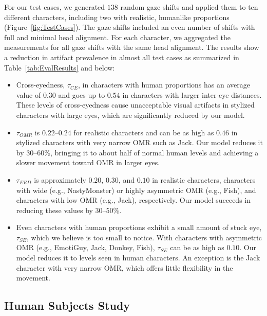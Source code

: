 For our test cases, we generated $138$ random gaze shifts and applied them to ten different characters, including two with realistic, humanlike proportions (Figure~\ref{fig:TestCases}). The gaze shifts included an even number of shifts with full and minimal head alignment. For each character, we aggregated the measurements for all gaze shifts with the same head alignment. The results show a reduction in artifact prevalence in almost all test cases as summarized in Table~\ref{tab:EvalResults} and below:

\begin{itemize}

\item Cross-eyedness, $\tau_{CE}$, in characters with human proportions has an average value of $0.30$ and goes up to $0.54$ in characters with larger inter-eye distances. These levels of cross-eyedness cause unacceptable visual artifacts in stylized characters with large eyes, which are significantly reduced by our model.

\item $\tau_{OMR}$ is $0.22$--$0.24$ for realistic characters and can be as high as $0.46$ in stylized characters with very narrow OMR such as Jack. Our model reduces it by $30$--$60$\%, bringing it to about half of normal human levels and achieving a slower movement toward OMR in larger eyes.

\item $\tau_{ERD}$ is approximately $0.20$, $0.30$, and $0.10$ in realistic characters, characters with wide (e.g., NastyMonster) or highly asymmetric OMR (e.g., Fish), and characters with low OMR (e.g., Jack), respectively. Our model succeeds in reducing these values by $30$--$50$\%.

\item Even characters with human proportions exhibit a small amount of stuck eye, $\tau_{SE}$, which we believe is too small to notice. With characters with asymmetric OMR (e.g., EmotiGuy, Jack, Donkey, Fish), $\tau_{SE}$ can be as high as $0.10$. Our model reduces it to levels seen in human characters. An exception is the Jack character with very narrow OMR, which offers little flexibility in the movement.

\end{itemize}

\subsection{Human Subjects Study}

